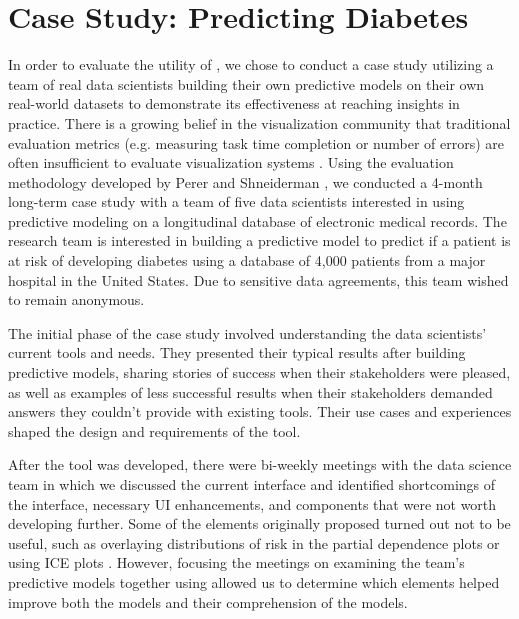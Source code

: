 
\section{Case Study: Predicting Diabetes}

In order to evaluate the utility of \prospector, we chose to conduct a case study utilizing a team of real data scientists building their own predictive models on their own real-world datasets to demonstrate its effectiveness at reaching insights in practice. There is a growing belief in the visualization community that traditional evaluation metrics (e.g. measuring task time completion or number of errors) are often insufficient to evaluate visualization systems \cite{bertini_summaries:_2011,plaisant_challenge_2004,shneiderman_strategies_2006}. Using the evaluation methodology developed by Perer and Shneiderman \cite{perer_integrating_2008}, we conducted a 4-month long-term case study with a team of five data scientists interested in using predictive modeling on a longitudinal database of electronic medical records. The research team is interested in building a predictive model to predict if a patient is at risk of developing diabetes using a database of 4,000 patients from a major hospital in the United States.  Due to sensitive data agreements, this team wished to remain anonymous.  

The initial phase of the case study involved understanding the data scientists' current tools and needs.  They presented their typical results after building predictive models, sharing stories of success when their stakeholders were pleased, as well as examples of less successful results when their stakeholders demanded answers they couldn't provide with existing tools.  Their use cases and experiences shaped the design and requirements of the tool.

After the tool was developed, there were bi-weekly meetings with the data science team in which we discussed the current interface and identified shortcomings of the interface, necessary UI enhancements, and components that were not worth developing further.  Some of the elements originally proposed turned out not to be useful, such as overlaying distributions of risk in the partial dependence plots or using ICE plots \cite{goldstein14}.  However, focusing the meetings on examining the team's predictive models together using \prospector allowed us to determine which elements helped improve both the models and their comprehension of the models.

